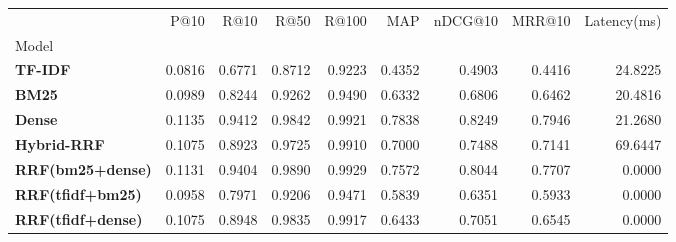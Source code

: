 \begin{tabular}{lrrrrrrrr}
\toprule
 & P@10 & R@10 & R@50 & R@100 & MAP & nDCG@10 & MRR@10 & Latency(ms) \\
Model &  &  &  &  &  &  &  &  \\
\midrule
\textbf{TF-IDF} & 0.0816 & 0.6771 & 0.8712 & 0.9223 & 0.4352 & 0.4903 & 0.4416 & 24.8225 \\
\textbf{BM25} & 0.0989 & 0.8244 & 0.9262 & 0.9490 & 0.6332 & 0.6806 & 0.6462 & 20.4816 \\
\textbf{Dense} & 0.1135 & 0.9412 & 0.9842 & 0.9921 & 0.7838 & 0.8249 & 0.7946 & 21.2680 \\
\textbf{Hybrid-RRF} & 0.1075 & 0.8923 & 0.9725 & 0.9910 & 0.7000 & 0.7488 & 0.7141 & 69.6447 \\
\textbf{RRF(bm25+dense)} & 0.1131 & 0.9404 & 0.9890 & 0.9929 & 0.7572 & 0.8044 & 0.7707 & 0.0000 \\
\textbf{RRF(tfidf+bm25)} & 0.0958 & 0.7971 & 0.9206 & 0.9471 & 0.5839 & 0.6351 & 0.5933 & 0.0000 \\
\textbf{RRF(tfidf+dense)} & 0.1075 & 0.8948 & 0.9835 & 0.9917 & 0.6433 & 0.7051 & 0.6545 & 0.0000 \\
\bottomrule
\end{tabular}
